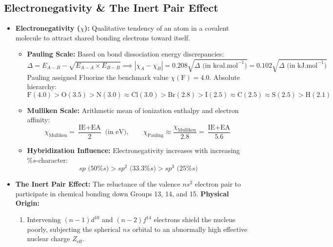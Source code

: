 \documentclass[10pt,a4paper]{article}
\begin{document}
\subsection{Electronegativity \& The Inert Pair Effect}
\begin{itemize}
  \item \textbf{Electronegativity ($\chi$):} Qualitative tendency of an atom in a covalent molecule to attract shared bonding electrons toward itself.
  \begin{itemize}
    \item \textbf{Pauling Scale:} Based on bond dissociation energy discrepancies:
    \begin{equation}
      \Delta = E_{A-B} - \sqrt{E_{A-A} \times E_{B-B}} \implies |\chi_A - \chi_B| = 0.208\sqrt{\Delta\text{ (in kcal.mol}^{-1}\text{)}} = 0.102\sqrt{\Delta\text{ (in kJ.mol}^{-1}\text{)}}
    \end{equation}
    Pauling assigned Fluorine the benchmark value $\chi(\mathrm{F}) = 4.0$. Absolute hierarchy:
    \begin{equation}
      \mathbf{\mathrm{F (4.0) > O (3.5) > N (3.0) \approx Cl (3.0) > Br (2.8) > I (2.5) \approx C (2.5) \approx S (2.5) > H (2.1)}}
    \end{equation}
    \item \textbf{Mulliken Scale:} Arithmetic mean of ionization enthalpy and electron affinity:
    \begin{equation}
      \chi_{\text{Mulliken}} = \frac{\text{IE} + \text{EA}}{2}\text{ (in eV)}, \qquad \chi_{\text{Pauling}} \approx \frac{\chi_{\text{Mulliken}}}{2.8} = \frac{\text{IE} + \text{EA}}{5.6}
    \end{equation}
    \item \textbf{Hybridization Influence:} Electronegativity increases with increasing $\% s$-character:
    \begin{equation}
      sp\text{ (50\% } s\text{)} > sp^2\text{ (33.3\% } s\text{)} > sp^3\text{ (25\% } s\text{)}
    \end{equation}
  \end{itemize}
  \item \textbf{The Inert Pair Effect:}
  The reluctance of the valence $ns^2$ electron pair to participate in chemical bonding down Groups 13, 14, and 15.
  \textbf{Physical Origin:}
  \begin{enumerate}
    \item Intervening $(n-1)d^{10}$ and $(n-2)f^{14}$ electrons shield the nucleus poorly, subjecting the spherical $ns$ orbital to an abnormally high effective nuclear charge $Z_{\text{eff}}$.

\end{enumerate}
\end{itemize}
\end{document}
